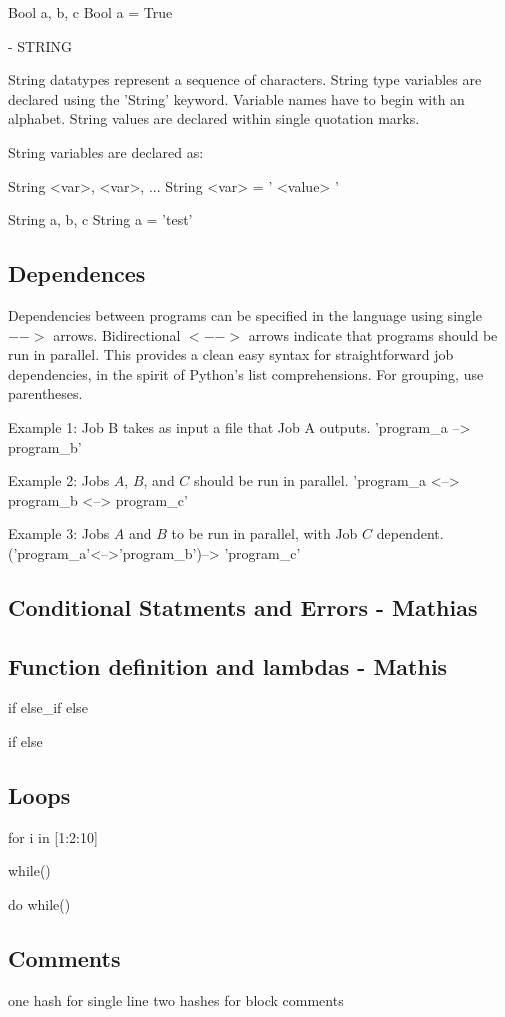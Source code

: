 Bool a, b, c
Bool a = True



- STRING

String datatypes represent a sequence of characters. String type variables are declared using the 'String' keyword. Variable names have to begin with an alphabet. String values are declared within single quotation marks.

String variables are declared as:

String <var>, <var>, ...
String <var> = ' <value> '

String a, b, c
String a = 'test'


\subsection{Dependences}
Dependencies between programs can be specified in the language using single $-->$ arrows. Bidirectional $<-->$ arrows indicate that programs should be run in parallel. This provides a clean easy syntax for straightforward job dependencies, in the spirit of Python's list comprehensions. For grouping, use parentheses.

Example 1:
Job B takes as input a file that Job A outputs. 'program_a --> program_b'

Example 2: 
Jobs $A$, $B$, and $C$ should be run in parallel. 'program_a <--> program_b <--> program_c'

Example 3:
Jobs $A$ and $B$ to be run in parallel, with Job $C$ dependent. ('program_a'<-->'program_b')--> 'program_c'
\subsection{Conditional Statments and Errors - Mathias}

\subsection{Function definition and lambdas - Mathis}

if {}
else\_if {}
else{}

if {}
else{}


\subsection{Loops}
for i in [1:2:10]{}

while(){}

do{}
while()



\subsection{Comments}
one hash for single line
two hashes for block comments


\label{sect:core}
